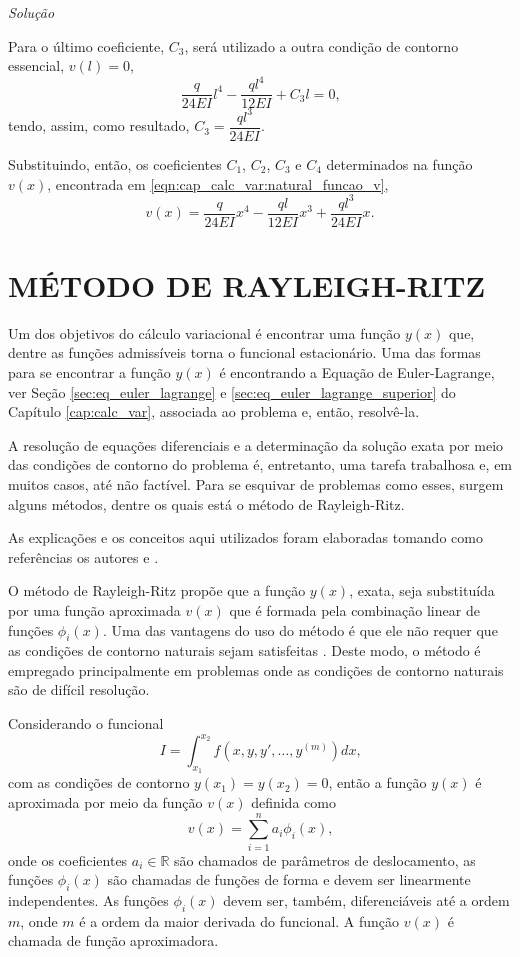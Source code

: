 \documentclass[
	12pt,				%
	openright,			%
    twoside,			%
	a4paper,			%
	chapter=TITLE,		%
	english,			%
	french,				%
	spanish,			%
	brazil				%
	]{abntex2}
\makeatletter
\renewenvironment{proof}[1][\proofname]{
	\par\pushQED{\qed}%
	\normalfont \topsep6\p@\@plus6\p@\relax
	\trivlist
	\item\relax
		{\itshape
			#1\@addpunct{.}}\hspace\labelsep\ignorespaces
}{%
	\popQED\endtrivlist\@endpefalse
}
\newenvironment{solution}{
	\begin{proof}[Solução]
}{%
	\end{proof}
}
\numberwithin{lema}{chapter}
\numberwithin{teorema}{chapter}
\numberwithin{definicao}{chapter}
\numberwithin{exemplo}{chapter}
\numberwithin{figure}{chapter}
\makeatother
\begin{document}
\begin{solution}
	Para o último coeficiente, $C_3$, será utilizado a outra condição de contorno essencial, $v(l)=0$,
	$$
		\frac{q}{24EI}l^4
		-
		\frac{ql^4}{12EI}
		+
		C_3l
		= 0
		\text{,}
	$$
	tendo, assim, como resultado, $C_3=\dfrac{ql^3}{24EI}$.

	Substituindo, então, os coeficientes $C_1$, $C_2$, $C_3$ e $C_4$ determinados na função $v(x)$, encontrada em \eqref{eqn:cap_calc_var:natural_funcao_v},
	\begin{equation}
	\label{eqn:sol_funcional_analitico}
	v(x) = 
		\frac{q}{24EI} x^4
		-
		\frac{ql}{12EI} x^3
		+
		\frac{ql^3}{24EI} x
		\text{.}
	\end{equation}
\end{solution}

\chapter{MÉTODO DE RAYLEIGH-RITZ}
\label{cap:mrr}

Um dos objetivos do cálculo variacional é encontrar uma função $y(x)$ que, dentre as funções admissíveis torna o funcional estacionário. Uma das formas para se encontrar a função $y(x)$ é encontrando a Equação de Euler-Lagrange, ver Seção \ref{sec:eq_euler_lagrange} e \ref{sec:eq_euler_lagrange_superior} do Capítulo \ref{cap:calc_var}, associada ao problema e, então, resolvê-la. 

A resolução de equações diferenciais e a determinação da solução exata por meio das condições de contorno do problema é, entretanto,  uma tarefa trabalhosa e, em muitos casos, até não factível. Para se esquivar de problemas como esses, surgem alguns métodos, dentre os quais está o método de Rayleigh-Ritz.

As explicações e os conceitos aqui utilizados foram elaboradas tomando como referências os autores  e .

O método de Rayleigh-Ritz propõe que a função $y(x)$, exata, seja substituída por uma função aproximada $v(x)$ que é formada pela combinação linear de funções $\phi _i(x)$. Uma das vantagens do uso do método é que ele não requer que as condições de contorno naturais sejam satisfeitas \cite{GROSSI_2001}. Deste modo, o método é empregado principalmente em problemas onde as condições de contorno naturais são de difícil resolução.

Considerando o funcional
$$
	I=\int_{x_1}^{x_2} f(x,y,y',\dots,y^{(m)})dx
	\text{,}
$$
com as condições de contorno $y(x_1)=y(x_2)=0$, então a função $y(x)$ é aproximada por meio da função $v(x)$ definida como
$$
	v(x) = \sum_{i=1}^n a_i \phi _i (x)
	\text{,}
$$
onde os coeficientes $a_i \in \mathbb{R}$ são chamados de parâmetros de deslocamento, as funções $\phi_i(x)$ são chamadas de funções de forma e devem ser linearmente independentes. As funções $\phi_i(x)$ devem ser, também, diferenciáveis até a ordem $m$, onde $m$ é a ordem da maior derivada do funcional. A função $v(x)$ é chamada de função aproximadora.
\end{document}
